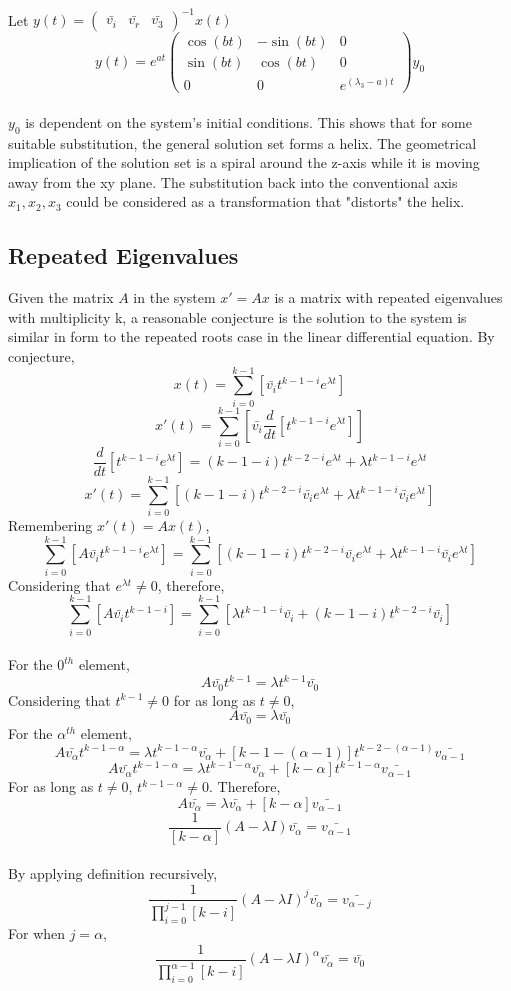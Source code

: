 \documentclass[a4paper, 12pt]{report}
\def\a{\alpha}
\def\la{\lambda}
\def\f{\frac}
\def\l{\left}
\def\r{\right}
\def\dst{\displaystyle}
\def\b{\bar}
\begin{document}
\begin{center}
\\Let $\dst{y(t) = \begin{pmatrix} \b{v_i}&\b{v_r} &\b{v_3} \end{pmatrix} ^{-1 }x(t)}$
$$y(t) = e^{at} \begin{pmatrix}\cos{(bt)} &-\sin{(bt)} &0\\\sin{(bt)}&\cos{(bt)} & 0\\0& 0& e^{(\la_3 - a)t}\end{pmatrix} y_0$$
\\$y_0$ is dependent on the system's initial conditions. This shows that for some suitable substitution, the general solution set forms a helix. The geometrical implication of the solution set is a spiral around the z-axis while it is moving away from the xy plane. The substitution back into the conventional axis $x_1,x_2,x_3$ could be considered as a transformation that "distorts" the helix. 
\subsection{Repeated Eigenvalues}
Given the matrix $A$ in the system $x' = Ax$ is a matrix with repeated eigenvalues with multiplicity k, a reasonable conjecture is the solution to the system is similar in form to the repeated roots case in the linear differential equation. By conjecture,
$$x(t) = \sum_{i = 0}^{k - 1}\l[\b{v_i} t^{k - 1 - i}e^{\la t}\r]$$
$$x'(t) = \sum_{i = 0}^{k - 1}\l[\b{v_i} \f{d}{dt}\l[t^{k - 1 - i}e^{\la t}\r] \r]$$
$$\f{d}{dt}\l[t^{k - 1 - i}e^{\la t}\r] = (k - 1 - i)t^{k - 2 - i}e^{\la t} + \la t^{k - 1 - i}e^{\la t} $$
$$x'(t) = \sum_{i = 0}^{k - 1}\l[(k - 1 - i)t^{k - 2 - i}\b{v_i}e^{\la t} + \la t^{k - 1 - i}\b{v_i}e^{\la t} \r]$$
Remembering $x'(t) = Ax(t)$,
$$\sum_{i = 0}^{k - 1}\l[A\b{v_i} t^{k - 1 - i}e^{\la t}\r] = \sum_{i = 0}^{k - 1}\l[ (k - 1 - i)t^{k - 2 - i}\b{v_i}e^{\la t} + \la t^{k - 1 - i}\b{v_i}e^{\la t} \r]$$
Considering that $e^{\la t} \neq 0$, therefore, 
$$\sum_{i = 0}^{k - 1}\l[A\b{v_i} t^{k - 1 - i}\r] = \sum_{i = 0}^{k - 1}\l[ \la t^{k - 1 - i}\b{v_i} + (k - 1 - i)t^{k - 2 - i}\b{v_i}\r]$$
\\For the $0^{th}$ element,
$$A\b{v_0}t^{k - 1} = \la t^{k - 1}\b{v_0}$$
Considering that $t^{k - 1} \neq 0$ for as long as $t \neq 0$,
$$A\b{v_0} = \la \b{v_0}$$
For the $\a^{th}$ element, 
$$A\b{v_\a} t^{k - 1 - \a} = \la t^{k - 1 - \a}\b{v_\a} +  \l[k - 1 - (\a - 1)\r]t^{k - 2 - (\a - 1)}\b{v_{\a - 1}}$$
$$A\b{v_\a} t^{k - 1 - \a} = \la t^{k - 1 - \a}\b{v_\a} +  \l[k - \a \r]t^{k - 1 - \a}\b{v_{\a - 1}}$$
For as long as $t\neq 0$,  $t^{k - 1- \a}\neq 0$. Therefore, 
$$A\b{v_\a} = \la \b{v_\a} +  \l[k - \a \r]\b{v_{\a - 1}}$$
$$\f{1}{\l[k - \a \r]} (A - \la I)\b{v_\a} = \b{v_{\a - 1}}$$
\\By applying definition recursively,
$$\f{1}{\dst{\prod_{i = 0}^{j - 1}\l[k - i \r]}} (A - \la I)^j \b{v_\a} = \b{v_{\a - j}}$$
For when $j = \a$,
$$\f{1}{\dst{\prod_{i = 0}^{\a - 1}\l[k - i \r]}} (A - \la I)^\a \b{v_\a} = \b{v_{0}}$$

\end{center}
\end{document}
